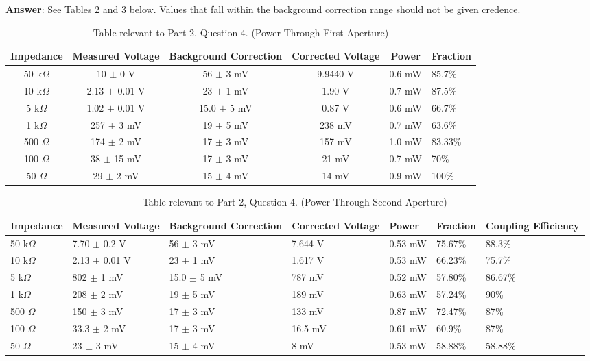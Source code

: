 \documentclass[10pt,a4paper]{article}
\begin{document}
\begin{enumerate}
\textbf{Answer}: See Tables 2 and 3 below. Values that fall within the background correction range should not be given credence.
\begin{table}[h]
\centering
\begin{tabular}{|cccccp{2cm}|}
\hline 
Impedance & Measured Voltage & Background Correction & Corrected Voltage & Power & Fraction\footnotemark \\
\hline 
50 k$\Omega$ & 10 $\pm$ 0 V & 56 $\pm$ 3 mV & 9.9440 V & 0.6 mW & 85.7\% \\ 
\hline 
10 k$\Omega$ & 2.13 $\pm$ 0.01 V & 23 $\pm$ 1 mV & 1.90 V & 0.7 mW & 87.5\% \\ 
\hline 
5 k$\Omega$ & 1.02 $\pm$ 0.01 V & 15.0 $\pm$ 5 mV & 0.87 V & 0.6 mW & 66.7\% \\ 
\hline 
1 k$\Omega$ & 257 $\pm$ 3 mV & 19 $\pm$ 5 mV & 238 mV & 0.7 mW & 63.6\% \\ 
\hline 
500 $\Omega$ & 174 $\pm$ 2 mV & 17 $\pm$ 3 mV & 157 mV & 1.0 mW & 83.33\% \\ 
\hline 
100 $\Omega$ & 38 $\pm$ 15 mV & 17 $\pm$ 3 mV & 21 mV & 0.7 mW & 70\%\\ 
\hline 
50 $\Omega$ & 29 $\pm$ 2 mV & 15 $\pm$ 4 mV & 14 mV & 0.9 mW & 100\%\\ 
\hline 
\end{tabular}
\caption{Table relevant to Part 2, Question 4. (Power Through First Aperture)}
\end{table}
\begin{table}[h]
\centering
\begin{tabular}{|p{2cm}p{2cm}p{2cm}p{2cm}p{2cm}p{2cm}p{2cm}|}
\hline 
Impedance & Measured Voltage & Background Correction & Corrected Voltage & Power & Fraction\footnotemark & Coupling Efficiency\footnotemark \\
\hline 
50 k$\Omega$ & 7.70 $\pm$ 0.2 V & 56 $\pm$ 3 mV & 7.644 V & 0.53 mW & 75.67\% & 88.3\% \\ 
\hline 
10 k$\Omega$ & 2.13 $\pm$ 0.01 V & 23 $\pm$ 1 mV & 1.617 V & 0.53 mW & 66.23\% & 75.7\% \\ 
\hline 
5 k$\Omega$ & 802 $\pm$ 1 mV & 15.0 $\pm$ 5 mV & 787 mV & 0.52 mW & 57.80\% & 86.67\% \\ 
\hline 
1 k$\Omega$ & 208 $\pm$ 2 mV & 19 $\pm$ 5 mV & 189 mV & 0.63 mW & 57.24\% & 90\% \\ 
\hline 
500 $\Omega$ & 150 $\pm$ 3 mV & 17 $\pm$ 3 mV & 133 mV & 0.87 mW & 72.47\% & 87\% \\ 
\hline 
100 $\Omega$ & 33.3 $\pm$ 2 mV & 17 $\pm$ 3 mV & 16.5 mV & 0.61 mW & 60.9\% & 87\%\\ 
\hline 
50 $\Omega$ & 23 $\pm$ 3 mV & 15 $\pm$ 4 mV & 8 mV & 0.53 mW & 58.88\% & 58.88\%\\ 
\hline 
\end{tabular}
\caption{Table relevant to Part 2, Question 4. (Power Through Second Aperture)}
\end{table}
\end{enumerate}
\end{document}

